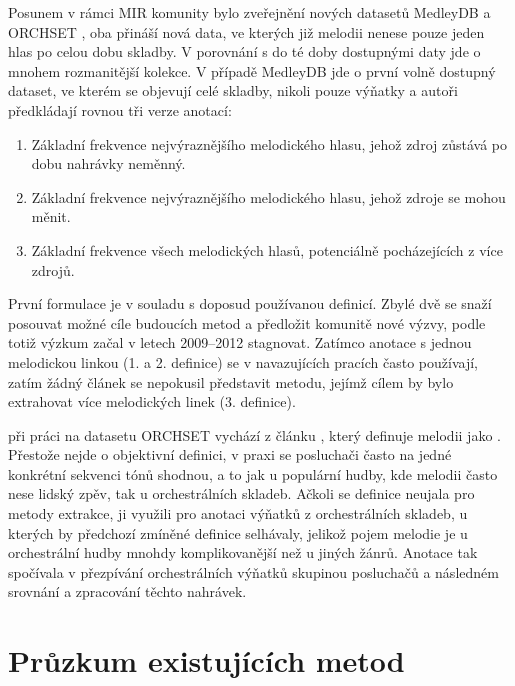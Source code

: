 Posunem v rámci MIR komunity bylo zveřejnění nových datasetů MedleyDB \citep{Bittner2014} a ORCHSET \citep{Bosch2016}, oba přináší nová data, ve kterých již melodii nenese pouze jeden hlas po celou dobu skladby. V porovnání s do té doby dostupnými daty jde o mnohem rozmanitější kolekce. V případě MedleyDB jde o první volně dostupný dataset, ve kterém se objevují celé skladby, nikoli pouze výňatky a autoři předkládají rovnou tři verze anotací:

\begin{enumerate}
    \item Základní frekvence nejvýraznějšího melodického hlasu, jehož zdroj zůstává po dobu nahrávky neměnný.
    \item Základní frekvence nejvýraznějšího melodického hlasu, jehož zdroje se mohou měnit.
    \item Základní frekvence všech melodických hlasů, potenciálně pocházejících z více zdrojů.
\end{enumerate}

První formulace je v souladu s doposud používanou definicí. Zbylé dvě se snaží posouvat možné cíle budoucích metod a předložit komunitě nové výzvy, podle \cite{Salamon2014} totiž výzkum začal v letech 2009--2012 stagnovat. Zatímco anotace s jednou melodickou linkou (1. a 2. definice) se v navazujících pracích často používají, zatím žádný článek se nepokusil představit metodu, jejímž cílem by bylo extrahovat více melodických linek (3. definice).

\cite{Bosch2016} při práci na datasetu ORCHSET vychází z článku \cite{Poliner2007}, který definuje melodii jako . Přestože nejde o objektivní definici, v praxi se posluchači často na jedné konkrétní sekvenci tónů shodnou, a to jak u populární hudby, kde melodii často nese lidský zpěv, tak u orchestrálních skladeb. Ačkoli se definice neujala pro metody extrakce, \cite{Bosch2016} ji využili pro anotaci výňatků z orchestrálních skladeb, u kterých by předchozí zmíněné definice selhávaly, jelikož pojem melodie je u orchestrální hudby mnohdy komplikovanější než u jiných žánrů. Anotace tak spočívala v přezpívání orchestrálních výňatků skupinou posluchačů a následném srovnání a zpracování těchto nahrávek.

\section{Průzkum existujících metod}

